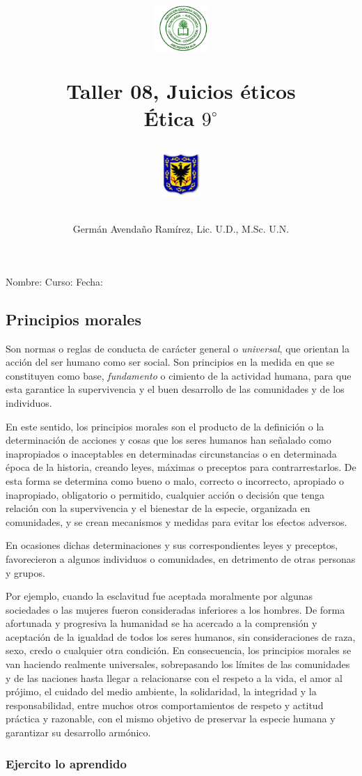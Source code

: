 \documentclass[10pt,twoside]{article}
\author{Germ\'an Avenda\~no Ram\'irez, Lic. U.D., M.Sc. U.N.}
\title{\begin{minipage}{.2\textwidth}
\includegraphics[height=1.75cm]{Images/logo-colegio.png}\end{minipage}
\begin{minipage}{.55\textwidth}
\begin{center}
Taller 08, Juicios éticos\\
Ética $9^{\circ}$
\end{center}
\end{minipage}\hfill
\begin{minipage}{.2\textwidth}
\includegraphics[height=1.75cm]{Images/logo-sed.png} 
\end{minipage}}
\date{}
\begin{document}
\maketitle
Nombre: \hrulefill Curso: \underline{\hspace*{44pt}} Fecha: \underline{\hspace*{2.5cm}}
\subsection*{Principios morales}
Son normas o reglas de conducta de carácter general o
\emph{universal}, que orientan la acción del ser humano como ser social. Son principios en la medida en que se constituyen como base, \emph{fundamento} o cimiento de la actividad humana, para que esta garantice la supervivencia y el buen desarrollo de las comunidades y de los individuos.

En este sentido, los principios morales son el producto
de la definición o la determinación de acciones y cosas
que los seres humanos han señalado como inapropiados o
inaceptables en determinadas circunstancias o en determinada época de la historia, creando leyes, máximas o preceptos para contrarrestarlos. De esta forma se determina como bueno o malo, correcto o incorrecto, apropiado o inapropiado, obligatorio o permitido, cualquier acción o decisión que tenga relación con la supervivencia y el bienestar de la especie, organizada en comunidades, y se crean mecanismos y medidas para evitar los efectos adversos.

En ocasiones dichas determinaciones y sus correspondientes leyes y preceptos, favorecieron a algunos individuos o comunidades, en detrimento de otras personas y grupos.

Por ejemplo, cuando la esclavitud fue aceptada moralmente por algunas sociedades o las mujeres fueron consideradas inferiores a los hombres. De forma afortunada y progresiva la humanidad se ha acercado a la comprensión y aceptación de la igualdad de todos los seres humanos, sin consideraciones de raza, sexo, credo o cualquier otra condición. En consecuencia, los principios morales
se van haciendo realmente universales, sobrepasando los límites de las comunidades y de las naciones hasta llegar a relacionarse con el respeto a la vida, el amor al prójimo, el cuidado del medio ambiente, la solidaridad, la integridad y la responsabilidad, entre muchos otros comportamientos de respeto y actitud práctica y razonable, con el mismo objetivo de preservar la especie humana y garantizar su desarrollo armónico.
\subsubsection*{Ejercito lo aprendido}
\end{document}
